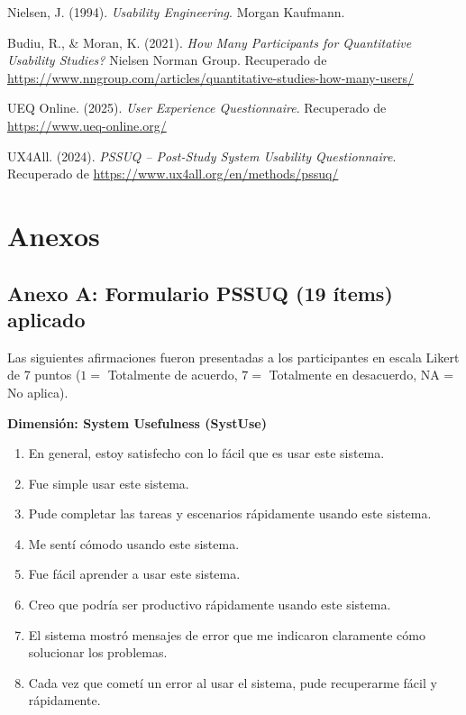 \documentclass[a4paper,12pt]{report}
\begin{document}
\begin{enumerate}[label={[}\arabic{*}{]}]
    \item Nielsen, J. (1994). \textit{Usability Engineering}. Morgan Kaufmann.
    \item Budiu, R., \& Moran, K. (2021). \textit{How Many Participants for Quantitative Usability Studies?} Nielsen Norman Group. Recuperado de \url{https://www.nngroup.com/articles/quantitative-studies-how-many-users/}
    \item UEQ Online. (2025). \textit{User Experience Questionnaire}. Recuperado de \url{https://www.ueq-online.org/}
    \item UX4All. (2024). \textit{PSSUQ -- Post-Study System Usability Questionnaire}. Recuperado de \url{https://www.ux4all.org/en/methods/pssuq/}
\end{enumerate}

\newpage

\chapter*{Anexos}

\section*{Anexo A: Formulario PSSUQ (19 ítems) aplicado}

Las siguientes afirmaciones fueron presentadas a los participantes en escala Likert de 7 puntos ($1 =$ Totalmente de acuerdo, $7 =$ Totalmente en desacuerdo, NA = No aplica).

\textbf{Dimensión: System Usefulness (SystUse)}
\begin{enumerate}
    \item En general, estoy satisfecho con lo fácil que es usar este sistema.
    \item Fue simple usar este sistema.
    \item Pude completar las tareas y escenarios rápidamente usando este sistema.
    \item Me sentí cómodo usando este sistema.
    \item Fue fácil aprender a usar este sistema.
    \item Creo que podría ser productivo rápidamente usando este sistema.
    \item El sistema mostró mensajes de error que me indicaron claramente cómo solucionar los problemas.
    \item Cada vez que cometí un error al usar el sistema, pude recuperarme fácil y rápidamente.
\end{enumerate}
\end{document}
